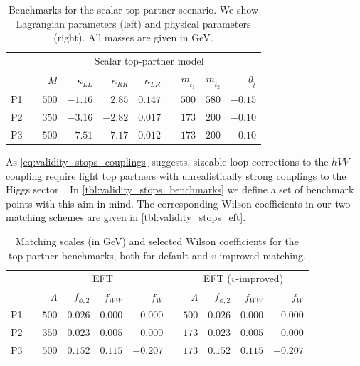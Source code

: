 \begin{table}
\begin{tabular}{c c rrrr c rrr}
  \toprule
  \multirow{2}{*}{}
  && \multicolumn{8}{c}{Scalar top-partner model} \\
  \cmidrule{3-10}
  && $M$ & $\kappa_{LL}$ & $\kappa_{RR}$ & $\kappa_{LR}$
  && $m_{\tilde{t}_{1}}$ & $m_{{\tilde{t}_{2}}}$ & $\theta_{\tilde{t}}$ \\
  \midrule
  P1 && $500$ & $-1.16$ & $2.85$ & $0.147$ && $500$ & $580$ & $-0.15$ \\
  P2 && $350$ & $-3.16$ & $-2.82$ & $0.017$ && $173$ & $200$ & $-0.10$ \\
  P3 && $500$ & $-7.51$ & $-7.17$ & $0.012$ && $173$ & $200$ & $-0.10$ \\
  \bottomrule
 \end{tabular}
 \caption[Benchmarks for the top partners]{Benchmarks for the
   scalar top-partner scenario. We show Lagrangian parameters (left)
   and physical parameters (right). All masses are given in GeV.}
  \label{tbl:validity_stops_benchmarks}
\end{table}

As \autoref{eq:validity_stops_couplings} suggests, sizeable loop
corrections to the $hVV$ coupling require light top partners with
unrealistically strong couplings to the Higgs
sector~\cite{Hollik:2008xn}. In
\autoref{tbl:validity_stops_benchmarks} we define a set of benchmark
points with this aim in mind. The corresponding Wilson coefficients in
our two matching schemes are given in
\autoref{tbl:validity_stops_eft}.

\begin{table}
  \begin{tabular}{c c rrrr c rrrr}
    \toprule
    \multirow{2}{*}{}
    && \multicolumn{4}{c}{EFT} && \multicolumn{4}{c}{EFT ($v$-improved)} \\
    \cmidrule{3-6} \cmidrule{8-11}
    && $\Lambda$ & $f_{\phi,2}$ & $f_{WW}$ & $f_W$
    && $\Lambda$ & $f_{\phi,2}$ & $f_{WW}$ & $f_W$ \\
    \midrule
    P1 && $500$ & $0.026$ & $0.000$ & $0.000$ && $500$ & $0.026$ & $0.000$ & $0.000$\\
    P2 && $350$ & $0.023$ & $0.005$ & $0.000$ && $173$ & $0.023$ & $0.005$ & $0.000$ \\
    P3 && $500$ & $0.152$ & $0.115$ & $-0.207$ && $173$ & $0.152$ & $0.115$ & $-0.207$ \\
    \bottomrule
  \end{tabular}
  \caption[EFT description for the top-partner benchmarks]{Matching
    scales (in GeV) and selected Wilson coefficients
    for the top-partner benchmarks, both for default and $v$-improved
    matching.}
  \label{tbl:validity_stops_eft}
\end{table}

